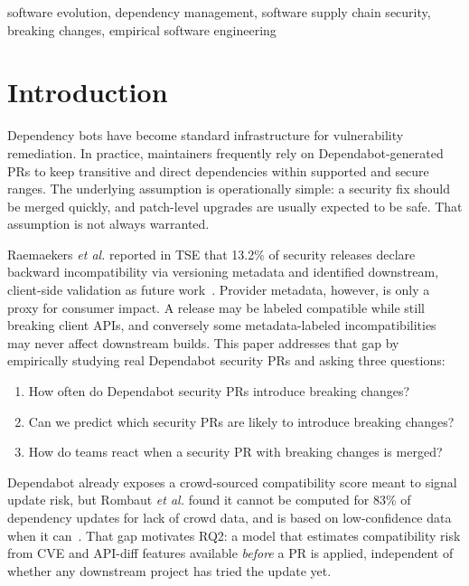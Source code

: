 \documentclass[10pt,journal]{IEEEtran}
\begin{document}
\begin{IEEEkeywords}
software evolution, dependency management, software supply chain security, breaking changes, empirical software engineering
\end{IEEEkeywords}

\section{Introduction}
Dependency bots have become standard infrastructure for vulnerability remediation. In practice, maintainers frequently rely on Dependabot-generated PRs to keep transitive and direct dependencies within supported and secure ranges. The underlying assumption is operationally simple: a security fix should be merged quickly, and patch-level upgrades are usually expected to be safe. That assumption is not always warranted.

Raemaekers \textit{et al.} reported in TSE that 13.2\% of security releases declare backward incompatibility via versioning metadata and identified downstream, client-side validation as future work~\cite{raemaekers2021}. Provider metadata, however, is only a proxy for consumer impact. A release may be labeled compatible while still breaking client APIs, and conversely some metadata-labeled incompatibilities may never affect downstream builds. This paper addresses that gap by empirically studying real Dependabot security PRs and asking three questions:

\begin{enumerate}
\item How often do Dependabot security PRs introduce breaking changes?
\item Can we predict which security PRs are likely to introduce breaking changes?
\item How do teams react when a security PR with breaking changes is merged?
\end{enumerate}

Dependabot already exposes a crowd-sourced compatibility score meant to signal update risk, but Rombaut \textit{et al.} found it cannot be computed for 83\% of dependency updates for lack of crowd data, and is based on low-confidence data when it can~\cite{rombaut2024}. That gap motivates RQ2: a model that estimates compatibility risk from CVE and API-diff features available \emph{before} a PR is applied, independent of whether any downstream project has tried the update yet.
\end{document}
